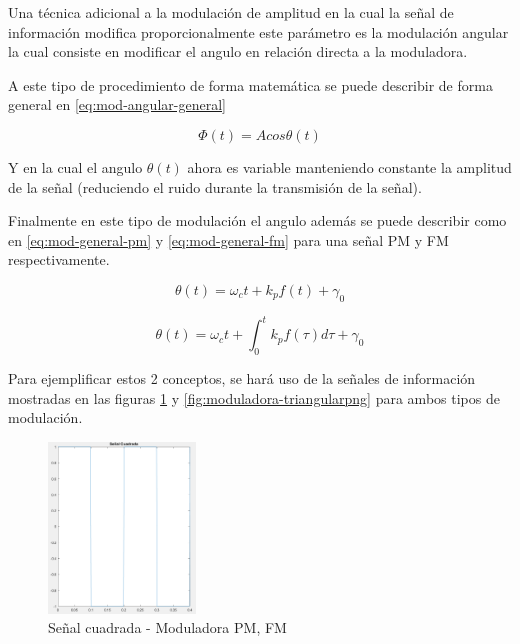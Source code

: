 \documentclass[conference]{IEEEtran}
\begin{document}
	Una técnica adicional a la modulación de amplitud en la cual la señal de información modifica proporcionalmente este parámetro es la modulación angular la cual consiste en modificar el angulo en relación directa a la moduladora.
	
	A este tipo de procedimiento de forma matemática se puede describir de forma general en \ref{eq:mod-angular-general}
	
	\begin{equation}
		\Phi(t) = Acos\theta (t)
		\label{eq:mod-angular-general}
	\end{equation}
	
	Y en la cual el angulo $\theta(t)$ ahora es variable manteniendo constante la amplitud de la señal (reduciendo el ruido durante la transmisión de la señal).
	
	Finalmente en este tipo de modulación el angulo además se puede describir como en \ref{eq:mod-general-pm} y \ref{eq:mod-general-fm} para una señal PM y FM respectivamente.
	
	\begin{equation}
		\theta(t) = \omega_ct + k_pf(t) + \gamma_0
		\label{eq:mod-general-pm}
	\end{equation}
	
	\begin{equation}
		\theta(t) = \omega_ct + \int_0^t{k_pf(\tau) d\tau} + \gamma_0
		\label{eq:mod-general-fm}
	\end{equation}
	
	Para ejemplificar estos 2 conceptos, se hará uso de la señales de información mostradas en las figuras \ref{fig:moduladora-cuadrada} y \ref{fig:moduladora-triangularpng} para ambos tipos de modulación.
	
	\begin{figure}[h]
		\centering
		\includegraphics[width=0.35\textwidth]{media/moduladora-cuadrada}
		\caption{Señal cuadrada - Moduladora PM, FM}
		\label{fig:moduladora-cuadrada}
	\end{figure}
	
\end{document}
